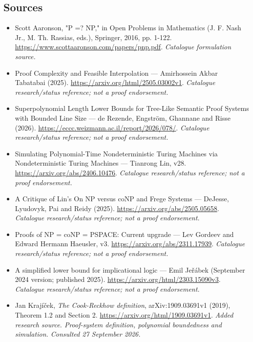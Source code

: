 \documentclass[11pt,a4paper]{article}
\begin{document}
\subsection{Sources}
\begin{itemize}\raggedright
\item[\textnormal{[S1]}]\hypertarget{source:30006679:1}{} Scott Aaronson, "P =? NP," in Open Problems in Mathematics (J. F. Nash Jr., M. Th. Rassias, eds.), Springer, 2016, pp. 1-122.
\url{https://www.scottaaronson.com/papers/pnp.pdf}.
{\small\textit{Catalogue formulation source.}}
\item[\textnormal{[S2]}]\hypertarget{source:30006679:2}{} Proof Complexity and Feasible Interpolation — Amirhossein Akbar Tabatabai (2025).
\url{https://arxiv.org/html/2505.03002v1}.
{\small\textit{Catalogue research/status reference; not a proof endorsement.}}
\item[\textnormal{[S3]}]\hypertarget{source:30006679:3}{} Superpolynomial Length Lower Bounds for Tree-Like Semantic Proof Systems with Bounded Line Size — de Rezende, Engström, Ghannane and Risse (2026).
\url{https://eccc.weizmann.ac.il/report/2026/078/}.
{\small\textit{Catalogue research/status reference; not a proof endorsement.}}
\item[\textnormal{[S4]}]\hypertarget{source:30006679:4}{} Simulating Polynomial-Time Nondeterministic Turing Machines via Nondeterministic Turing Machines — Tianrong Lin, v28.
\url{https://arxiv.org/abs/2406.10476}.
{\small\textit{Catalogue research/status reference; not a proof endorsement.}}
\item[\textnormal{[S5]}]\hypertarget{source:30006679:5}{} A Critique of Lin's On NP versus coNP and Frege Systems — DeJesse, Lyudovyk, Pai and Reidy (2025).
\url{https://arxiv.org/abs/2505.05658}.
{\small\textit{Catalogue research/status reference; not a proof endorsement.}}
\item[\textnormal{[S6]}]\hypertarget{source:30006679:6}{} Proofs of NP = coNP = PSPACE: Current upgrade — Lev Gordeev and Edward Hermann Haeusler, v3.
\url{https://arxiv.org/abs/2311.17939}.
{\small\textit{Catalogue research/status reference; not a proof endorsement.}}
\item[\textnormal{[S7]}]\hypertarget{source:30006679:7}{} A simplified lower bound for implicational logic — Emil Jeřábek (September 2024 version; published 2025).
\url{https://arxiv.org/html/2303.15090v3}.
{\small\textit{Catalogue research/status reference; not a proof endorsement.}}
\item[\textnormal{[E1]}]\hypertarget{extra:30006679:1}{} Jan Krajíček, \emph{The Cook-Reckhow definition}, arXiv:1909.03691v1 (2019), Theorem 1.2 and Section 2.
\url{https://arxiv.org/html/1909.03691v1}.
{\small\textit{Added research source. Proof-system definition, polynomial boundedness and simulation. Consulted 27 September 2026.}}
\end{itemize}

\end{document}
